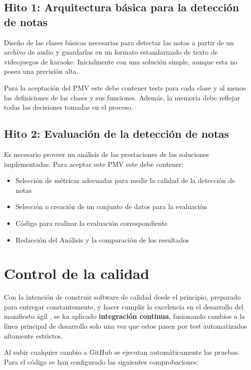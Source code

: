 \subsection*{Hito 1: Arquitectura básica para la detección de notas}

Diseño de las clases básicas necesarias para detectar las notas a partir de un archivo de audio y guardarlas en un formato estandarizado de texto de videojuegos de karaoke. Inicialmente con una solución simple, aunque esta no posea una precisión alta.

Para la aceptación del PMV este debe contener tests para cada clase y al menos las definiciones de las clases y sus funciones. Además, la memoria debe reflejar todas las decisiones tomadas en el proceso.

\subsection*{Hito 2: Evaluación de la detección de notas}

Es necesario proveer un análisis de las prestaciones de las soluciones implementadas. Para aceptar este PMV este debe contener:
\begin{itemize}
	\item{Selección de métricas adecuadas para medir la calidad de la detección de notas}
	\item{Selección o creación de un conjunto de datos para la evaluación}
	\item{Código para realizar la evaluación correspondiente}
	\item{Redacción del Análisis y la comparación de los resultados}
\end{itemize}

\section{Control de la calidad}

Con la intención de construir software de calidad desde el principio, preparado para entregar constantemente, y hacer cumplir la excelencia en el desarrollo del manifiesto ágil \cite{beck2001agile}, se ha aplicado \textbf{integración continua}, fusionando cambios a la línea principal de desarrollo solo una vez que estos pasen por test automatizados altamente estrictos.

Al subir cualquier cambio a GitHub se ejecutan automáticamente las pruebas. Para el código se han configurado las siguientes comprobaciones:

